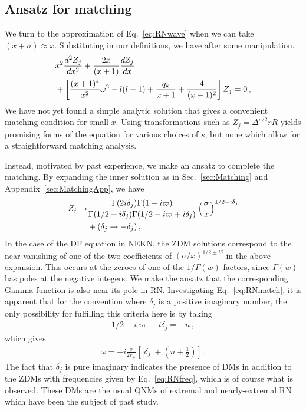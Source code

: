\begin{refsection}
\subsection{Ansatz for matching}

We turn to the approximation of Eq.~\eqref{eq:RNwave} when we can take $(x + \sigma) \approx x$. 
Substituting in our definitions, we have after some manipulation,
\begin{align}
&x^2 \frac{d^2 Z_j}{dx^2} + \frac{2x}{(x+1)} \frac{d Z_j}{dx} \notag \\ & + \left[\frac{(x+1)^4}{x^2}  \omega^2 - l(l+1) + \frac{q_k}{x+1} + \frac{4}{(x+1)^2}\right] Z_j  = 0 \,,
\end{align}
We have not yet found a simple analytic solution that gives a convenient matching condition for small $x$. Using transformations such as $Z_j = \Delta^{s/2} r R$ yields promising forms of the equation for various choices of $s$, but none which allow for a straightforward matching analysis. 

Instead, motivated by past experience, we make an ansatz to complete the matching. By expanding the inner solution as in Sec.~\ref{sec:Matching} and Appendix~\ref{sec:MatchingApp}, we have
\begin{align}
\label{eq:RNmatch}
Z_j \to &\frac{\Gamma(2 i \delta_j) \Gamma(1-i \varpi)}{\Gamma(1/2 + i \delta_j)\Gamma(1/2 - i \varpi + i \delta_j)} \left( \frac{\sigma}{x} \right)^{1/2-i\delta_j}\notag \\
&+ (\delta_j \to - \delta_j) \,,
\end{align}
In the case of the DF equation in NEKN, the ZDM solutions correspond to the near-vanishing of one of the two coefficients of $(\sigma/x)^{1/2 \pm i \delta}$ in the above expansion. This occurs at the zeroes of one of the $1/\Gamma(w)$ factors, since $\Gamma(w)$ has poles at the negative integers. We make the ansatz that the corresponding Gamma function is also near its pole in RN. Investigating Eq.~\eqref{eq:RNmatch}, it is apparent that for the convention where $\delta_j$ is a positive imaginary number, the only possibility for fulfilling this criteria here is by taking 
\begin{align}
\label{eq:RNprematch}
1/2 - i \varpi - i \delta_j = - n \,,
\end{align}
which gives 
\begin{align}
\label{eq:RNfreq}
\omega = -i \frac{\sigma}{2r_+} \left[ |\delta_j| + \left(n + \frac 12 \right)\right] \,.
\end{align}
The fact that $\delta_j$ is pure imaginary indicates the presence of DMs in addition to the ZDMs with frequencies given by Eq.~\eqref{eq:RNfreq}, which is of course what is observed. 
These DMs are the usual QNMs of extremal and nearly-extremal RN which have been the subject of past study.


\end{refsection}
